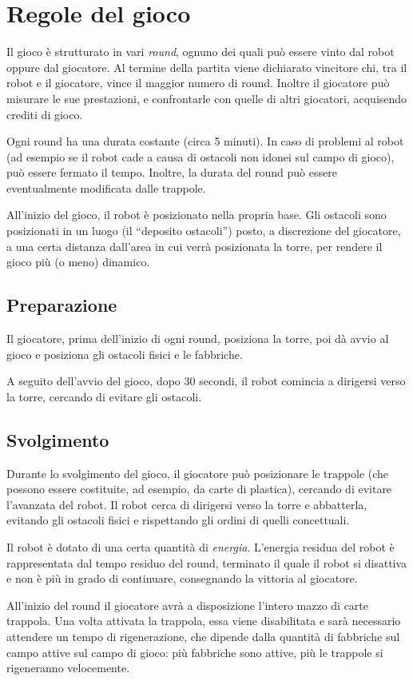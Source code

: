 \section{Regole del gioco} 
Il gioco è strutturato in vari \emph{round}, ognuno dei quali può essere vinto dal robot oppure dal giocatore. Al termine della partita viene dichiarato vincitore chi, tra il robot e il giocatore, vince il maggior numero di round. Inoltre il giocatore può misurare le sue prestazioni, e confrontarle con quelle di altri giocatori, acquisendo crediti di gioco.

Ogni round ha una durata costante (circa 5 minuti). In caso di problemi al robot (ad esempio se il robot cade a causa di ostacoli non idonei sul campo di gioco), può essere fermato il tempo. Inoltre, la durata del round può essere eventualmente modificata dalle trappole.

All'inizio del gioco, il robot è posizionato nella propria base. Gli ostacoli sono posizionati in un luogo (il ``deposito ostacoli'') posto, a discrezione del giocatore, a una certa distanza dall'area in cui verrà posizionata la torre, per rendere il gioco più (o meno) dinamico.


	\subsection*{Preparazione}
Il giocatore, prima dell'inizio di ogni round, posiziona la torre, poi dà avvio al gioco e posiziona gli ostacoli fisici e le fabbriche.

A seguito dell'avvio del gioco, dopo 30 secondi, il robot comincia a dirigersi verso la torre, cercando di evitare gli ostacoli.
	
	\subsection*{Svolgimento}
	Durante lo svolgimento del gioco, il giocatore può posizionare le trappole (che possono essere costituite, ad esempio, da carte di plastica), cercando di evitare l'avanzata del robot. Il robot cerca di dirigersi verso la torre e abbatterla, evitando gli ostacoli fisici e rispettando gli ordini di quelli concettuali.

Il robot è dotato di una certa quantità di \emph{energia}. L'energia residua del robot è rappresentata dal tempo residuo del round, terminato il quale il robot si disattiva e non è più in grado di continuare, consegnando la vittoria al giocatore.

All'inizio del round il giocatore avrà a disposizione l'intero mazzo di carte trappola. Una volta attivata la trappola, essa viene disabilitata e sarà necessario attendere un tempo di rigenerazione, che dipende dalla quantità di fabbriche sul campo attive sul campo di gioco: più fabbriche sono attive, più le trappole si rigeneranno velocemente.

